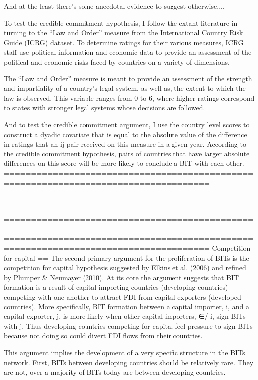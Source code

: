 And at the least there's some anecdotal evidence to suggest otherwise....

To test the credible commitment hypothesis, I follow the extant literature in turning to the “Law and Order” measure from the International Country Risk Guide (ICRG) dataset. To determine ratings for their various measures, ICRG staff use political information and economic data to provide an assessment of the political and economic risks faced by countries on a variety of dimensions. 

The “Law and Order” measure is meant to provide an assessment of the strength and impartiality of a country’s legal system, as well as, the extent to which the law is observed. This variable ranges from 0 to 6, where higher ratings correspond to states with stronger legal systems whose decisions are followed. 

And to test the credible commitment argument, I use the country level scores to construct a dyadic covariate that is equal to the absolute value of the difference in ratings that an ij pair received on this measure in a given year. According to the credible commitment hypothesis, pairs of countries that have larger absolute differences on this score will be more likely to conclude a BIT with each other.
====================================================================================
====================================================================================

====================================================================================
====================================================================================
Competition for capital
==
The second primary argument for the proliferation of BITs is the competition for capital hypothesis suggested by Elkins et al. (2006) and refined by Plumper & Neumayer (2010). At its core the argument suggests that BIT formation is a result of capital importing countries (developing countries) competing with one another to attract FDI from capital exporters (developed countries). More specifically, BIT formation between a capital importer, i, and a capital exporter, j, is more likely when other capital importers, ∈/ i, sign BITs with j. Thus developing countries competing for capital feel pressure to sign BITs because not doing so could divert FDI flows from their countries.

This argument implies the development of a very specific structure in the BITs network. First, BITs between developing countries should be relatively rare. They are not, over a majority of BITs today are between developing countries. 

